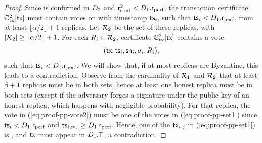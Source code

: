 \begin{proof}
	Since \tx is confirmed in $D_2$ and $\textsf{r}_\text{conf}^2 < D_1.\textsf{r}_\text{perf}$, the transaction certificate $\mathbb{C}_\text{tx}^2[\textsf{tx}]$ must contain votes on \tx with timestamp $\textsf{ts}_i$, such that $\textsf{ts}_i < D_1.\textsf{r}_\text{perf}$, from at least $\lfloor \alpha/2 \rfloor + 1$ replicas.
	Let $\mathcal{R}_2$ be the set of these replicas, with $|\allreps_2| \geq \lfloor \alpha/2 \rfloor + 1$.
	For each $R_i \in \mathcal{R}_2$, certificate $\mathbb{C}_\text{tx}^2[\textsf{tx}]$ contains a vote
	\begin{equation}\label{eq:proof-pp-vote2}
		(\textsf{tx}, \textsf{ts}_i, \textsf{sn}_i, \sigma_i, R_i),
	\end{equation}
	such that $\textsf{ts}_i < D_1.\textsf{r}_\text{perf}$.
	We will show that, if at most \beta replicas are Byzantine, this leads to a contradiction.
	Observe from the cardinality of $\mathcal{R}_1$ and $\mathcal{R}_2$ that at least $\beta + 1$ replicas must be in both sets, hence at least one honest replica must be in both sets (except if the adversary forges a signature under the public key of an honest replica, which happens with negligible probability).
	For that replica, the vote in (\ref{eq:proof-pp-vote2}) must be one of the votes in (\ref{eq:proof-pp-set1}) since $\textsf{ts}_i < D_1.\textsf{r}_\text{perf}$ and $\textsf{ts}_{i, m_i} \geq D_1.\textsf{r}_\text{perf}$.
	Hence, one of the $\textsf{tx}_{i,j}$ in (\ref{eq:proof-pp-set1}) is \tx, and $\textsf{tx}$ must appear in $D_1.\textsf{T}$, a contradiction.
\end{proof}


